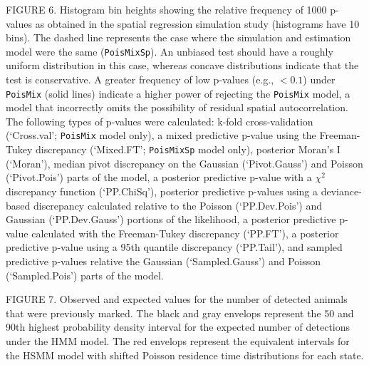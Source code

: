 \documentclass[12pt,english]{article}
\begin{document}
\begin{spacing}{1.9}
    FIGURE 6.  Histogram bin heights showing the relative frequency of
    1000 p-values as obtained in the spatial regression simulation
    study (histograms have 10 bins).  The dashed line represents the
    case where the simulation and estimation model were the same
    (\texttt{PoisMixSp}).  An unbiased test should have a roughly
    uniform distribution in this case, whereas concave distributions
    indicate that the test is conservative.  A greater frequency of
    low p-values (e.g., $<0.1$) under \texttt{PoisMix} (solid lines)
    indicate a higher power of rejecting the \texttt{PoisMix} model, a
    model that incorrectly omits the possibility of residual spatial
    autocorrelation.  The following types of p-values were calculated:
    k-fold cross-validation (`Cross.val'; \texttt{PoisMix} model
    only), a mixed predictive p-value using the Freeman-Tukey
    discrepancy (`Mixed.FT'; \texttt{PoisMixSp} model only), posterior
    Moran's I (`Moran'), median pivot discrepancy on the Gaussian
    (`Pivot.Gauss') and Poisson (`Pivot.Pois') parts of the model, a
    posterior predictive p-value with a $\chi^2$ discrepancy function
    (`PP.ChiSq'), posterior predictive p-values using a deviance-based
    discrepancy calculated relative to the Poisson (`PP.Dev.Pois') and
    Gaussian (`PP.Dev.Gauss') portions of the likelihood, a posterior
    predictive p-value calculated with the Freeman-Tukey discrepancy
    (`PP.FT'), a posterior predictive p-value using a 95th quantile
    discrepancy (`PP.Tail'), and sampled predictive p-values relative
    the Gaussian (`Sampled.Gauss') and Poisson (`Sampled.Pois') parts
    of the model.
    
    FIGURE 7. Observed and expected values for the number of detected animals that were previously marked. The black and gray envelops represent the 50 and 90th highest probability density interval for the expected number of detections under the HMM model. The red envelops represent the equivalent intervals for the HSMM model with shifted Poisson residence time distributions for each state.  


    \pagebreak


\end{spacing}
\end{document}
